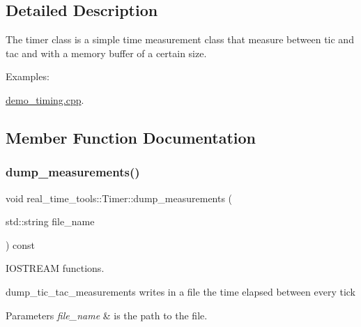 \subsection{Detailed Description}
The timer class is a simple time measurement class that measure between tic and tac and with a memory buffer of a certain size. \begin{Desc}
\item[Examples\+: ]\par
\hyperlink{demo_timing_8cpp-example}{demo\+\_\+timing.\+cpp}.\end{Desc}


\subsection{Member Function Documentation}
\mbox{\label{classreal__time__tools_1_1Timer_a05347a5971441d46b1293f8ed9361b0f}} 
\subsubsection{\texorpdfstring{dump\+\_\+measurements()}{dump\_measurements()}}
{\footnotesize\ttfamily void real\+\_\+time\+\_\+tools\+::\+Timer\+::dump\+\_\+measurements (\begin{DoxyParamCaption}\item[{std\+::string}]{file\+\_\+name }\end{DoxyParamCaption}) const}



I\+O\+S\+T\+R\+E\+AM functions. 

dump\+\_\+tic\+\_\+tac\+\_\+measurements writes in a file the time elapsed between every tick 
\begin{DoxyParams}{Parameters}
{\em file\+\_\+name} & is the path to the file. \\
\hline
\end{DoxyParams}
\mbox{\label{classreal__time__tools_1_1Timer_ac1be39401be7768a17cbe8388329f2fc}} 
